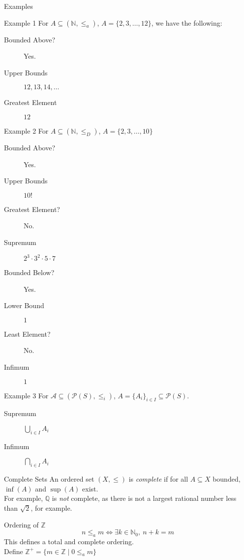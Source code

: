\documentclass[8pt]{extarticle}
\newcommand{\N}{\mathbb{N}}
\newcommand{\Q}{\mathbb{Q}}
\newcommand{\Z}{\mathbb{Z}}
\begin{document}
  \begin{problem}{Examples}
    \begin{problem}{Example 1}
      For $A\subseteq (\N,\leq_a)$, $A = \{2,3,\dots,12\}$, we have the following:
      \begin{description}
        \item[Bounded Above?] Yes.
        \item[Upper Bounds] $12,13,14,\dots$
        \item[Greatest Element] $12$
      \end{description}
    \end{problem}
    \begin{problem}{Example 2}
    For $A\subseteq (\N,\leq_D)$, $A = \{2,3,\dots,10\}$
    \begin{description}
      \item[Bounded Above?] Yes.
      \item[Upper Bounds] $10!$
      \item[Greatest Element?] No.
      \item[Supremum] $2^3\cdot3^2\cdot5\cdot7$
      \item[Bounded Below?] Yes.
      \item[Lower Bound] $1$
      \item[Least Element?] No.
      \item[Infimum] $1$
    \end{description}
    \end{problem}
    \begin{problem}{Example 3}
      For $\mathcal{A}\subseteq (\mathcal{P}(S),\leq_i)$, $A = \{A_i\}_{i\in I} \subseteq \mathcal{P}(S)$.
      \begin{description}
        \item[Supremum] $\bigcup_{i\in I}A_i$
        \item[Infimum] $\bigcap_{i\in I}A_i$
      \end{description}
    \end{problem}
  \end{problem}
  \begin{problem}{Complete Sets}
    An ordered set $(X,\leq)$ is \textit{complete} if for all $A\subseteq X$ bounded, $\inf(A)$ and $\sup(A)$ exist.\\

    For example, $\Q$ is \textit{not} complete, as there is not a largest rational number less than $\sqrt{2}$, for example.
  \end{problem}
  \begin{problem}{Ordering of $\Z$}
    \[
      n\leq_a m \Leftrightarrow \exists k\in \N_0,~n+k=m
    \] 
    This defines a total and complete ordering.\\

    Define $\Z^+ = \{m\in \Z\mid 0\leq_a m\}$
  \end{problem}
\end{document}
